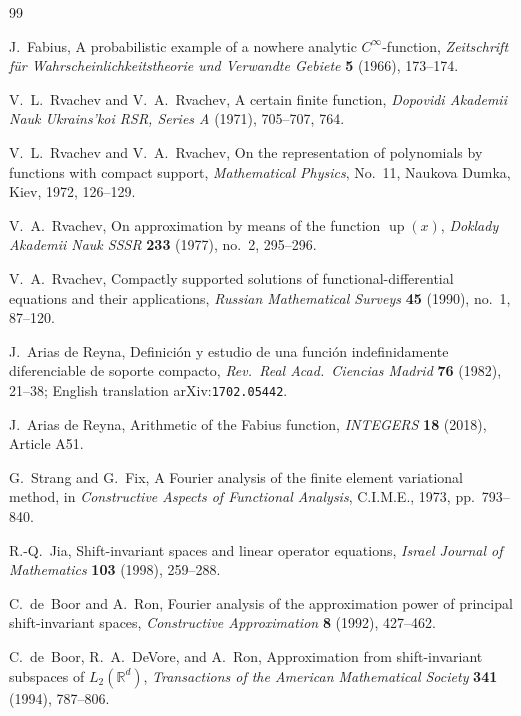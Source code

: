 \documentclass[11pt,oneside]{article}
\numberwithin{equation}{section}
\theoremstyle{definition}
\theoremstyle{remark}
\newcommand{\R}{\mathbb R}
\newcommand{\Up}{\operatorname{up}}
\begin{document}
\begin{thebibliography}{99}

J.~Fabius,
\newblock A probabilistic example of a nowhere analytic
$C^\infty$-function,
\newblock \emph{Zeitschrift f\"ur Wahrscheinlichkeitstheorie und
Verwandte Gebiete} \textbf{5} (1966), 173--174.

V.~L.~Rvachev and V.~A.~Rvachev,
\newblock A certain finite function,
\newblock \emph{Dopovidi Akademii Nauk Ukrains'koi RSR, Series A}
(1971), 705--707, 764.

V.~L.~Rvachev and V.~A.~Rvachev,
\newblock On the representation of polynomials by functions with
compact support,
\newblock \emph{Mathematical Physics}, No.~11, Naukova Dumka, Kiev,
1972, 126--129.

V.~A.~Rvachev,
\newblock On approximation by means of the function $\Up(x)$,
\newblock \emph{Doklady Akademii Nauk SSSR} \textbf{233} (1977),
no.~2, 295--296.

V.~A.~Rvachev,
\newblock Compactly supported solutions of functional-differential
equations and their applications,
\newblock \emph{Russian Mathematical Surveys} \textbf{45} (1990),
no.~1, 87--120.

J.~Arias de Reyna,
\newblock Definici\'on y estudio de una funci\'on indefinidamente
diferenciable de soporte compacto,
\newblock \emph{Rev.\ Real Acad.\ Ciencias Madrid} \textbf{76}
(1982), 21--38; English translation arXiv:\nolinkurl{1702.05442}.

J.~Arias de Reyna,
\newblock Arithmetic of the Fabius function,
\newblock \emph{INTEGERS} \textbf{18} (2018), Article A51.

G.~Strang and G.~Fix,
\newblock A Fourier analysis of the finite element variational
method,
\newblock in \emph{Constructive Aspects of Functional Analysis},
C.I.M.E., 1973, pp.~793--840.

R.-Q.~Jia,
\newblock Shift-invariant spaces and linear operator equations,
\newblock \emph{Israel Journal of Mathematics} \textbf{103} (1998),
259--288.

C.~de~Boor and A.~Ron,
\newblock Fourier analysis of the approximation power of principal
shift-invariant spaces,
\newblock \emph{Constructive Approximation} \textbf{8} (1992),
427--462.

C.~de~Boor, R.~A.~DeVore, and A.~Ron,
\newblock Approximation from shift-invariant subspaces of
$L_2(\R^{d})$,
\newblock \emph{Transactions of the American Mathematical Society}
\textbf{341} (1994), 787--806.


\end{thebibliography}
\end{document}
